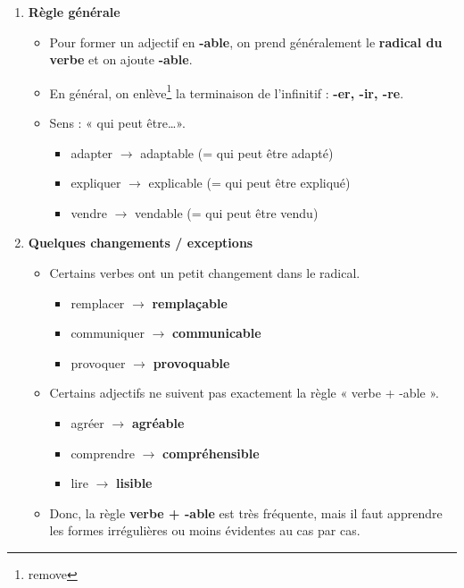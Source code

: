 \documentclass[math,code]{amznotes}
\theoremstyle{remark}
\begin{document}
\begin{enumerate}
    \item \textbf{Règle générale}
    \begin{itemize}
        \item Pour former un adjectif en \textbf{-able}, on prend généralement le
        \textbf{radical du verbe} et on ajoute \textbf{-able}.
        \item En général, on enlève\footnote{remove} la terminaison de l'infinitif :
        \textbf{-er, -ir, -re}.
        \item Sens : « qui peut être\dots ».
        \begin{itemize}
            \item adapter $\rightarrow$ adaptable \quad (= qui peut être adapté)
            \item expliquer $\rightarrow$ explicable \quad (= qui peut être expliqué)
            \item vendre $\rightarrow$ vendable \quad (= qui peut être vendu)
        \end{itemize}
    \end{itemize}

    \item \textbf{Quelques changements / exceptions}
    \begin{itemize}
        \item Certains verbes ont un petit changement dans le radical.
        \begin{itemize}
            \item remplacer $\rightarrow$ \textbf{remplaçable}
            \item communiquer $\rightarrow$ \textbf{communicable}
            \item provoquer $\rightarrow$ \textbf{provoquable}
        \end{itemize}
        
        \item Certains adjectifs ne suivent pas exactement la règle
        « verbe + -able ».
        \begin{itemize}
            \item agréer $\rightarrow$ \textbf{agréable}
            \item comprendre $\rightarrow$ \textbf{compréhensible}
            \item lire $\rightarrow$ \textbf{lisible}
        \end{itemize}
        
        \item Donc, la règle \textbf{verbe + -able} est très fréquente,
        mais il faut apprendre les formes irrégulières ou moins évidentes
        au cas par cas.
    \end{itemize}
\end{enumerate}
\end{document}
